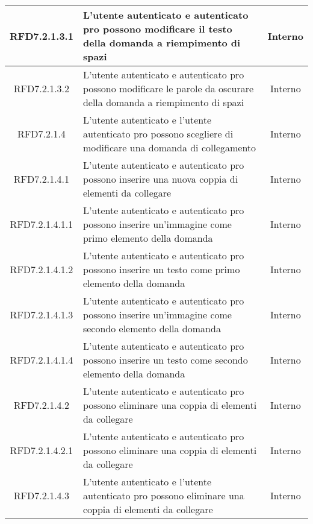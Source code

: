 \begin{longtable}{|c|>{\centering}m{7cm}|c|}
\hypertarget{RFD7.2.1.3.1}{RFD7.2.1.3.1} & L’utente autenticato e autenticato pro possono modificare il testo della domanda a riempimento di spazi & Interno
\\ \hline

\hypertarget{RFD7.2.1.3.2}{RFD7.2.1.3.2} & L’utente autenticato e autenticato pro possono modificare le parole da oscurare della domanda a riempimento di spazi  & Interno
\\ \hline

\hypertarget{RFD7.2.1.4}{RFD7.2.1.4} & L’utente autenticato e l’utente autenticato pro possono scegliere di modificare una domanda di collegamento & Interno
\\ \hline

\hypertarget{RFD7.2.1.4.1}{RFD7.2.1.4.1} & L’utente autenticato e autenticato pro possono inserire una nuova coppia di elementi da collegare & Interno
\\ \hline

\hypertarget{RFD7.2.1.4.1.1}{RFD7.2.1.4.1.1} & L’utente autenticato e autenticato pro possono inserire un’immagine come primo elemento della domanda & Interno
\\ \hline

\hypertarget{RFD7.2.1.4.1.2}{RFD7.2.1.4.1.2} & L’utente autenticato e autenticato pro possono inserire un testo come primo elemento della domanda & Interno
\\ \hline

\hypertarget{RFD7.2.1.4.1.3}{RFD7.2.1.4.1.3} & L’utente autenticato e autenticato pro possono inserire un’immagine come secondo elemento della domanda  & Interno
\\ \hline

\hypertarget{RFD7.2.1.4.1.4}{RFD7.2.1.4.1.4} & L’utente autenticato e autenticato pro possono inserire un testo come secondo elemento della domanda  & Interno
\\ \hline

\hypertarget{RFD7.2.1.4.2}{RFD7.2.1.4.2} & L’utente autenticato e autenticato pro possono eliminare una coppia di elementi da collegare & Interno
\\ \hline

\hypertarget{RFD7.2.1.4.2.1}{RFD7.2.1.4.2.1} & L’utente autenticato e autenticato pro possono eliminare una coppia di elementi da collegare & Interno
\\ \hline

\hypertarget{RFD7.2.1.4.3}{RFD7.2.1.4.3} & L’utente autenticato e l'utente autenticato pro possono eliminare una coppia di elementi da collegare & Interno
\\ \hline


\end{longtable}

